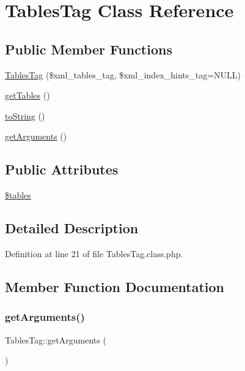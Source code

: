 \hypertarget{classTablesTag}{}\section{Tables\+Tag Class Reference}
\label{classTablesTag}
\subsection*{Public Member Functions}
\begin{DoxyCompactItemize}
\item 
\hyperlink{classTablesTag_a0ea7e51af16f15385a10c8f0984168d1}{Tables\+Tag} (\$xml\+\_\+tables\+\_\+tag, \$xml\+\_\+index\+\_\+hints\+\_\+tag=N\+U\+LL)
\item 
\hyperlink{classTablesTag_a7df694e7322df714e37c2c150c472bf5}{get\+Tables} ()
\item 
\hyperlink{classTablesTag_a01ef1da6c0c67a0b89a5174d44272ff9}{to\+String} ()
\item 
\hyperlink{classTablesTag_a6398e51952c21a5e713499d61114492a}{get\+Arguments} ()
\end{DoxyCompactItemize}
\subsection*{Public Attributes}
\begin{DoxyCompactItemize}
\item 
\hyperlink{classTablesTag_ad37e049d751434627d0ae2e1eb9d431a}{\$tables}
\end{DoxyCompactItemize}


\subsection{Detailed Description}


Definition at line 21 of file Tables\+Tag.\+class.\+php.



\subsection{Member Function Documentation}
\mbox{\label{classTablesTag_a6398e51952c21a5e713499d61114492a}} 
\subsubsection{\texorpdfstring{get\+Arguments()}{getArguments()}}
{\footnotesize\ttfamily Tables\+Tag\+::get\+Arguments (\begin{DoxyParamCaption}{ }\end{DoxyParamCaption})}



